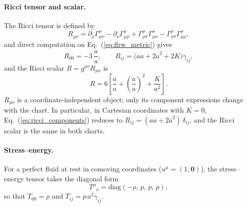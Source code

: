 \documentclass[12pt]{article}
\begin{document}
\paragraph{Ricci tensor and scalar.}
The Ricci tensor is defined by
%
\begin{equation}
  R_{\mu\nu}
  = \partial_\rho\Gamma^\rho_{\mu\nu}
    - \partial_\nu\Gamma^\rho_{\mu\rho}
    + \Gamma^\rho_{\rho\sigma}\Gamma^\sigma_{\mu\nu}
    - \Gamma^\rho_{\nu\sigma}\Gamma^\sigma_{\mu\rho},
  \label{eq:ricci_def}
\end{equation}
%
and direct computation on Eq.~(\ref{eq:flrw_metric}) gives
%
\begin{equation}
  R_{00} = -3\,\frac{\ddot a}{a},
  \qquad
  R_{ij} = \bigl(a\ddot a + 2\dot a^2 + 2K\bigr)\gamma_{ij},
  \label{eq:ricci_components}
\end{equation}
%
and the Ricci scalar $R = g^{\mu\nu}R_{\mu\nu}$ is
%
\begin{equation}
  R = 6\!\left[\frac{\ddot a}{a}
            + \left(\frac{\dot a}{a}\right)^{\!2}
            + \frac{K}{a^2}\right].
\end{equation}
%
$R_{\mu\nu}$ is a coordinate-independent object; only its component
expressions change with the chart.  In particular, in Cartesian
coordinates with $K=0$, Eq.~(\ref{eq:ricci_components}) reduces to
$R_{ij} = (a\ddot a + 2\dot a^2)\,\delta_{ij}$, and the Ricci scalar
is the same in both charts.

\paragraph{Stress--energy.}
For a perfect fluid at rest in comoving coordinates
($u^\mu = (1,\mathbf{0})$), the stress--energy tensor takes the
diagonal form
%
\begin{equation}
  T^\mu{}_\nu = \mathrm{diag}(-\rho,\,p,\,p,\,p),
  \label{eq:stress_energy}
\end{equation}
%
so that $T_{00} = \rho$ and $T_{ij} = p\,a^2\gamma_{ij}$.
\end{document}
